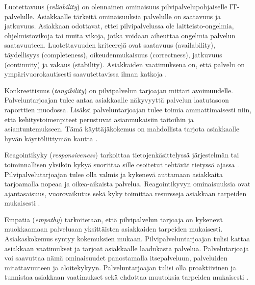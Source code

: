 Luotettavuus (\emph{reliability}) on olennainen ominaisuus pilvipalvelupohjaiselle IT-palvelulle. Asiakkaalle tärkeitä ominaisuuksia palvelulle on saatavuus ja jatkuvuus. Asiakkaan odottavat, ettei pilvipalvelussa ole laitteisto-ongelmia, ohjelmistovikoja tai muita vikoja, jotka voidaan aiheuttaa ongelmia palvelun saatavuuteen. Luotettavuuden kriteerejä ovat saatavuus (availability), täydellisyys (completeness), oikeudenmukaisuus (correctness), jatkuvuus (continuity) ja vakaus (stability). Asiakkaiden vaatimuksena on, että palvelu on ympärivuorokautisesti saavutettavissa ilman katkoja \citep{qualitymodel}.

Konkreettisuus (\emph{tangibility}) on pilvipalvelun tarjoajan mittari avoimuudelle. Palveluntarjoajan tulee antaa asiakkaalle näkyvyyttä palvelun laatutasoon raporttien muodossa. Lisäksi palveluntarjoajan tulee toimia ammattimaisesti niin, että kehitystoimenpiteet perustuvat asianmukaisiin taitoihin ja asiantuntemukseen.  Tämä käyttäjäkokemus on mahdollista tarjota asiakkaalle hyvän käyttöliittymän kautta \citep{qualitymodel}.

Reagointikyky (\emph{responsiveness}) tarkoittaa tietojenkäsittelyssä järjestelmän tai toiminnallisen yksikön kykyä suorittaa sille osoitetut tehtävät tietyssä ajassa \citep{dictionary}. Pilvipalvelutarjoajan tulee olla valmis ja kykenevä auttamaan asiakkaita tarjoamalla nopeaa ja oikea-aikaista palvelua. Reagointikyvyn ominaisuuksia ovat ajantasaisuus, vuorovaikutus sekä kyky toimittaa resursseja asiakkaan tarpeiden mukaisesti \citep{qualitymodel}.

Empatia (\emph{empathy}) tarkoitetaan, että pilvipalvelun tarjoaja on kykenevä muokkaamaan palveluaan yksittäisten asiakkaiden tarpeiden mukaisesti. Asiakaskokemus syntyy kokemuksien mukaan. Pilvipalveluntarjoajan tulisi kattaa asiakkaan vaatimukset ja tarjoat asiakkaalle laadukasta palvelua. Palvelutarjoaja voi saavuttaa nämä ominaisuudet panostamalla itsepalveluun, palveluiden mitattavuuteen ja aloitekykyyn. Palveluntarjoajan tulisi olla proaktiivinen ja tunnistaa asiakkaan vaatimukset sekä ehdottaa muutoksia tarpeiden mukaisesti \citep{qualitymodel}.
